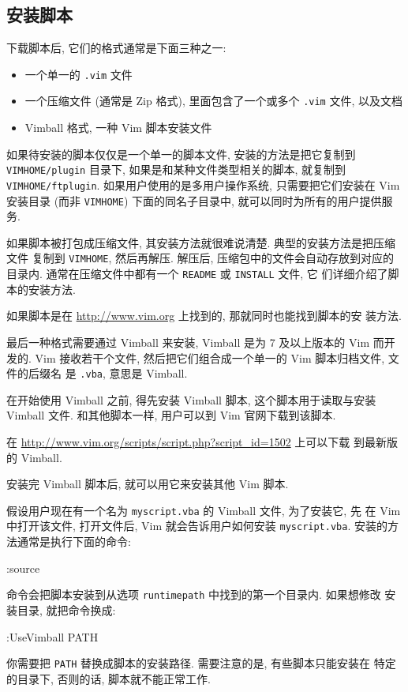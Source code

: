 \subsection{安装脚本}
\label{subsec:installing_scripts}

下载脚本后, 它们的格式通常是下面三种之一:
\begin{itemize}
    \item 一个单一的 \texttt{.vim} 文件
    \item 一个压缩文件 (通常是 Zip 格式), 里面包含了一个或多个 \texttt{.vim}
        文件, 以及文档
    \item Vimball 格式, 一种 Vim 脚本安装文件
\end{itemize}

如果待安装的脚本仅仅是一个单一的脚本文件, 安装的方法是把它复制到
\texttt{VIMHOME/plugin} 目录下, 如果是和某种文件类型相关的脚本, 就复制到
\texttt{VIMHOME/ftplugin}.
如果用户使用的是多用户操作系统, 只需要把它们安装在 Vim 安装目录 (而非
\texttt{VIMHOME}) 下面的同名子目录中, 就可以同时为所有的用户提供服务.

如果脚本被打包成压缩文件, 其安装方法就很难说清楚. 典型的安装方法是把压缩文件
复制到 \texttt{VIMHOME}, 然后再解压. 解压后, 压缩包中的文件会自动存放到对应的
目录内. 通常在压缩文件中都有一个 \texttt{README} 或 \texttt{INSTALL} 文件, 它
们详细介绍了脚本的安装方法.

\begin{warning}
    如果脚本是在 \url{http://www.vim.org} 上找到的, 那就同时也能找到脚本的安
    装方法.
\end{warning}

最后一种格式需要通过 Vimball 来安装, Vimball 是为 7 及以上版本的 Vim 而开发的.
Vim 接收若干个文件, 然后把它们组合成一个单一的 Vim 脚本归档文件, 文件的后缀名
是 \texttt{.vba}, 意思是 Vimball.

在开始使用 Vimball 之前, 得先安装 Vimball 脚本, 这个脚本用于读取与安装 Vimball
文件. 和其他脚本一样, 用户可以到 Vim 官网下载到该脚本.

\begin{warning}
    在 \url{http://www.vim.org/scripts/script.php?script_id=1502} 上可以下载
    到最新版的 Vimball.
\end{warning}

安装完 Vimball 脚本后, 就可以用它来安装其他 Vim 脚本.

假设用户现在有一个名为 \texttt{myscript.vba} 的 Vimball 文件, 为了安装它, 先
在 Vim 中打开该文件, 打开文件后, Vim 就会告诉用户如何安装
\texttt{myscript.vba}. 安装的方法通常是执行下面的命令:
\begin{vimcode}
:source %
\end{vimcode}
命令会把脚本安装到从选项 \texttt{runtimepath} 中找到的第一个目录内. 如果想修改
安装目录, 就把命令换成:
\begin{vimcode}
:UseVimball PATH
\end{vimcode}
你需要把 \texttt{PATH} 替换成脚本的安装路径. 需要注意的是, 有些脚本只能安装在
特定的目录下, 否则的话, 脚本就不能正常工作.


